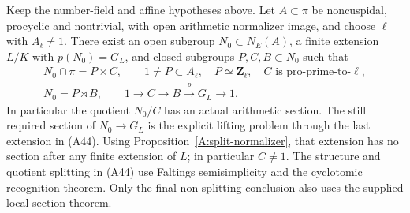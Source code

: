 \begin{proposition}
\label{A:normalizer-prime-complement}
Keep the number-field and affine hypotheses above.
Let $A\subset\pi$ be noncuspidal, procyclic and
nontrivial, with open arithmetic normalizer image,
and choose $\ell$ with $A_\ell\ne1$.
There exist an open subgroup $N_0\subset N_E(A)$,
a finite extension $L/K$ with $p(N_0)=G_L$,
and closed subgroups $P,C,B\subset N_0$ such that
\[
 \begin{gathered}
 N_0\cap\pi=P\times C,\qquad
 1\ne P\subset A_\ell,\quad P\simeq\mathbf Z_\ell,
       \quad C\text{ is pro-prime-to-}\ell,\\
 N_0=P\rtimes B,\qquad
 1\longrightarrow C\longrightarrow B
       \xrightarrow{p}G_L\longrightarrow1.
 \end{gathered}                                             \tag{A44}
\]
In particular the quotient $N_0/C$ has an actual
arithmetic section. The still required section of
$N_0\to G_L$ is the explicit lifting problem
through the last extension in (A44).
Using Proposition~\ref{A:split-normalizer}, that
extension has no section after any finite extension
of $L$; in particular $C\ne1$.
The structure and quotient splitting in (A44) use
Faltings semisimplicity and the cyclotomic recognition
theorem. Only the final non-splitting conclusion
also uses the supplied local section theorem.
\end{proposition}
